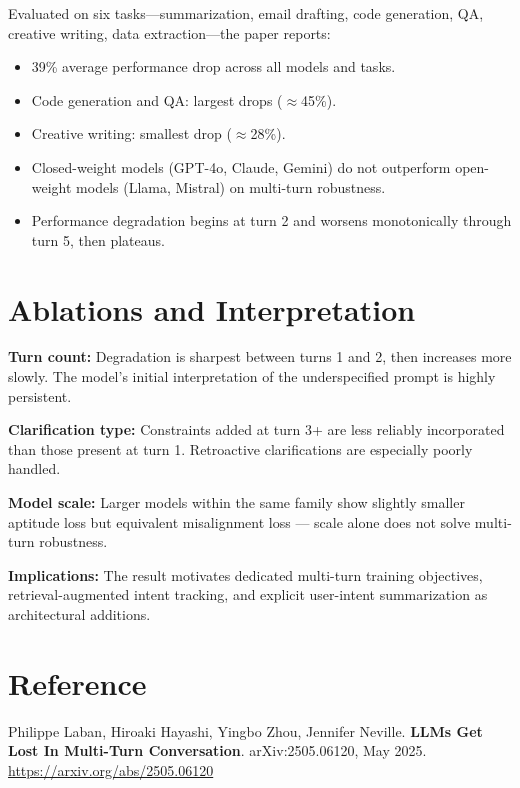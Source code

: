 \documentclass[10pt,twocolumn]{article}
\begin{document}
Evaluated on six tasks---summarization, email drafting, code generation,
QA, creative writing, data extraction---the paper reports:
\begin{itemize}[itemsep=2pt,parsep=0pt]
  \item 39\% average performance drop across all models and tasks.
  \item Code generation and QA: largest drops ($\approx$45\%).
  \item Creative writing: smallest drop ($\approx$28\%).
  \item Closed-weight models (GPT-4o, Claude, Gemini) do not outperform
    open-weight models (Llama, Mistral) on multi-turn robustness.
  \item Performance degradation begins at turn 2 and worsens monotonically
    through turn 5, then plateaus.
\end{itemize}

\section{Ablations and Interpretation}

\textbf{Turn count:} Degradation is sharpest between turns 1 and 2, then
increases more slowly. The model's initial interpretation of the underspecified
prompt is highly persistent.

\textbf{Clarification type:} Constraints added at turn 3+ are less reliably
incorporated than those present at turn 1. Retroactive clarifications are
especially poorly handled.

\textbf{Model scale:} Larger models within the same family show slightly
smaller aptitude loss but equivalent misalignment loss --- scale alone does
not solve multi-turn robustness.

\textbf{Implications:} The result motivates dedicated multi-turn training
objectives, retrieval-augmented intent tracking, and explicit user-intent
summarization as architectural additions.

\section*{Reference}

Philippe Laban, Hiroaki Hayashi, Yingbo Zhou, Jennifer Neville.
\textbf{LLMs Get Lost In Multi-Turn Conversation}.
arXiv:2505.06120, May 2025.
\url{https://arxiv.org/abs/2505.06120}
\end{document}
